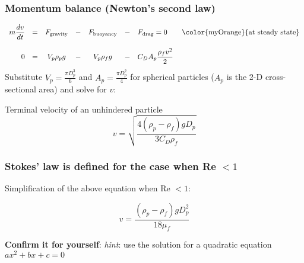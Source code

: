 \begin{frame}\frametitle{Momentum balance (Newton's second law)}
	\[
	\begin{array}{rcccccl}
		\displaystyle m\frac{dv}{dt} &=&  F_\text{gravity} &-& F_\text{buoyancy} &-& F_\text{drag} = 0 \qquad \text{\color{myOrange}{at steady state}} \\
		\\
		0 &=&  V_p \rho_p g &-& V_p \rho_f g &-& C_D A_p \displaystyle \frac{\rho_f v^2}{2} \label{MB}
	\end{array}
	\]
	Substitute $V_p = \displaystyle \frac{\pi D_p^3}{6}$ and $A_p = \displaystyle \frac{\pi D_p^2}{4}$ for spherical particles ($A_p$ is the 2-D cross-sectional area) and solve for $v$:

	\begin{exampleblock}{Terminal velocity of an unhindered particle}
		\[
			v = \sqrt{\frac{4\left(\rho_p - \rho_f \right)g D_p}{3 C_D \rho_f}} \tag{TSV}
		\]
	\end{exampleblock}
\end{frame}

\begin{frame}\frametitle{Stokes' law is defined for the case when Re $< 1$}

	Simplification of the above equation when Re $< 1$:

	\[
		v = \frac{\left( \rho_p - \rho_f \right) g D_p^2}{18 \mu_f} \label{TSV-low-Re}
	\]

	\vspace{12pt}
	\textbf{Confirm it for yourself}: \emph{hint}: use the solution for a quadratic equation $ax^2 + bx + c = 0$
	
\end{frame}

